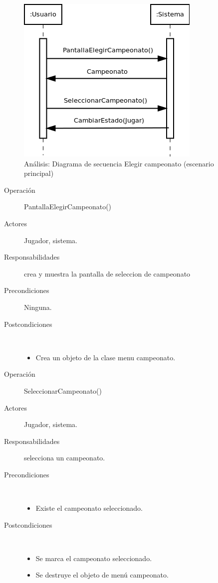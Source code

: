 \begin{figure}[H] 
  \label{secuencia_elegir_campeonato}
  \begin{center}
    \includegraphics[scale=0.6]{imagenes/analisis/secuencia_elegir_campeonato.png}
  \end{center}
  \caption{Análisis: Diagrama de secuencia Elegir campeonato (escenario principal)}
\end{figure}

\begin{description}
    \item [Operación] PantallaElegirCampeonato()
    \item [Actores] Jugador, sistema.
    \item [Responsabilidades] crea y muestra la pantalla de seleccion de campeonato
    \item [Precondiciones] Ninguna.
    \item [Postcondiciones] $\quad$
        \begin{itemize}
            \item Crea un objeto de la clase menu campeonato.
        \end{itemize}
\end{description}

\begin{description}
    \item [Operación] SeleccionarCampeonato()
    \item [Actores] Jugador, sistema.
    \item [Responsabilidades] selecciona un campeonato.
    \item [Precondiciones] $\quad$
        \begin{itemize}
            \item Existe el campeonato seleccionado.
        \end{itemize}
    \item [Postcondiciones] $\quad$
        \begin{itemize}
            \item Se marca el campeonato seleccionado.
            \item Se destruye el objeto de menú campeonato.
        \end{itemize}
\end{description}

